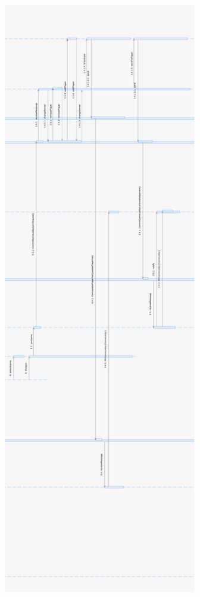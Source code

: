 \documentclass{article}
\begin{document}
\newpage
\addtolength{\oddsidemargin}{3cm}
\includegraphics[width=14cm, height = 26cm]{Entwurf_PlayCard2_2}\\
\newpage
\addtolength{\oddsidemargin}{1cm}
\end{document}
